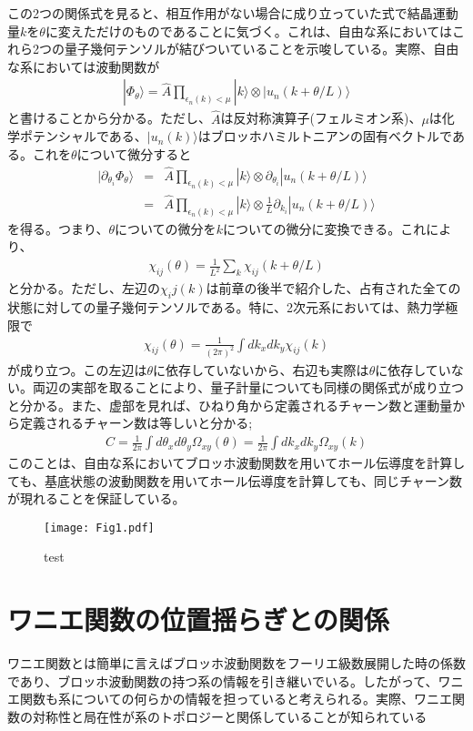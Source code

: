 \documentclass[12pt]{jsbook}
\newcommand{\ra}{\rangle}
\newcommand{\pa}{\partial}
\begin{document}
この2つの関係式を見ると、相互作用がない場合に成り立っていた式で結晶運動量$k$を$\theta$に変えただけのものであることに気づく。これは、自由な系においてはこれら2つの量子幾何テンソルが結びついていることを示唆している。実際、自由な系においては波動関数が
\begin{eqnarray}
    |\Phi_\theta\ra = \hat{A}\displaystyle \prod_{\epsilon_n(k)<\mu} |k\ra \otimes |u_n(k+\theta/L)\ra
\end{eqnarray}
と書けることから分かる。ただし、$\hat{A}$は反対称演算子(フェルミオン系)、$\mu$は化学ポテンシャルである、$|u_n(k)\ra$はブロッホハミルトニアンの固有ベクトルである。これを$\theta$について微分すると
\begin{eqnarray}
    |\pa_{\theta_i}\Phi_\theta \ra&=&\hat{A}\displaystyle \prod_{\epsilon_n(k)<\mu} |k\ra \otimes \pa_{\theta_i}|u_n(k+\theta/L)\ra\\
    &=&\hat{A}\displaystyle \prod_{\epsilon_n(k)<\mu} |k\ra \otimes \frac{1}{L}\pa_{k_i}|u_n(k+\theta/L)\ra
\end{eqnarray}
を得る。つまり、$\theta$についての微分を$k$についての微分に変換できる。これにより、
\begin{eqnarray}
    \chi_{ij}(\theta) = \frac{1}{L^2}\displaystyle \sum_k \chi_{ij}(k+\theta/L)
\end{eqnarray}
と分かる。ただし、左辺の$\chi_ij(k)$は前章の後半で紹介した、占有された全ての状態に対しての量子幾何テンソルである。特に、2次元系においては、熱力学極限で
\begin{eqnarray}
    \chi_{ij}(\theta)=\frac{1}{(2\pi)^2}\int　dk_xdk_y \chi_{ij}(k)
\end{eqnarray}
が成り立つ\cite{ozawa2021relations}。この左辺は$\theta$に依存していないから、右辺も実際は$\theta$に依存していない。両辺の実部を取ることにより、量子計量についても同様の関係式が成り立つと分かる。また、虚部を見れば、ひねり角から定義されるチャーン数と運動量から定義されるチャーン数は等しいと分かる;
\begin{eqnarray}
    C=\frac{1}{2\pi}\int d\theta_x d\theta_y \Omega_{xy}(\theta)=\frac{1}{2\pi}\int dk_x dk_y \Omega_{xy}(k)
\end{eqnarray}
このことは、自由な系においてブロッホ波動関数を用いてホール伝導度を計算しても、基底状態の波動関数を用いてホール伝導度を計算しても、同じチャーン数が現れることを保証している。
\begin{figure}
\centering
\texttt{[image: Fig1.pdf]}
\caption{test}
\label{fig:qmcompare}
\end{figure}

\section{ワニエ関数の位置揺らぎとの関係}
ワニエ関数とは簡単に言えばブロッホ波動関数をフーリエ級数展開した時の係数であり、ブロッホ波動関数の持つ系の情報を引き継いでいる。したがって、ワニエ関数も系についての何らかの情報を担っていると考えられる。実際、ワニエ関数の対称性と局在性が系のトポロジーと関係していることが知られている\cite{PhysRevLett.121.126402,2022arXiv220900007H}
\end{document}

